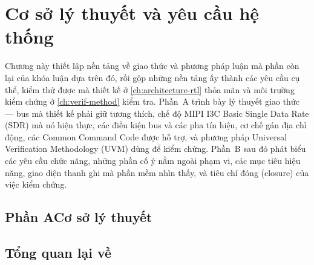 \chapter{Cơ sở lý thuyết và yêu cầu hệ thống}
\label{ch:background-requirements}

%

Chương này thiết lập nền tảng về giao thức và phương pháp luận mà phần còn lại của khóa
luận dựa trên đó, rồi gộp những nền tảng ấy thành các yêu cầu cụ thể, kiểm thử được mà
thiết kế ở \cref{ch:architecture-rtl} thỏa mãn và môi trường kiểm chứng ở
\cref{ch:verif-method} kiểm tra. Phần~A trình bày lý thuyết giao thức --- bus \iic{} mà
thiết kế phải giữ tương thích, chế độ MIPI I3C Basic Single Data Rate (SDR) mà nó hiện
thực, các điều kiện bus và các pha tín hiệu, cơ chế gán địa chỉ động, các Common Command
Code được hỗ trợ, và phương pháp Universal Verification Methodology (UVM) dùng để kiểm
chứng. Phần~B sau đó phát biểu các yêu cầu chức năng, những phần cố ý nằm ngoài phạm vi,
các mục tiêu hiệu năng, giao diện thanh ghi mà phần mềm nhìn thấy, và tiêu chí đóng (closure)
của việc kiểm chứng.

\section*{Phần A\quad Cơ sở lý thuyết}

\section{Tổng quan lại về \iic{}}
\label{sec:bg-i2c}

